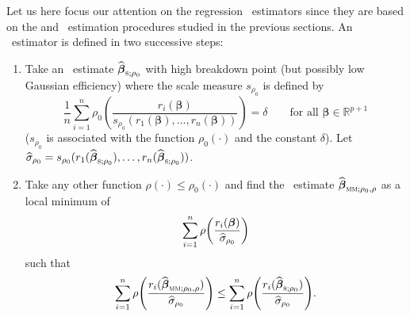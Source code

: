 Let us here focus our attention on the regression ~estimators since
they are based on the  and ~estimation procedures studied in
the previous sections. An ~estimator is defined in two successive
steps:

\begin{enumerate}
    \item Take an ~estimate $\sthat{\boldsymbol\beta}_{\stsc{S};\rho_0}$
    with high breakdown point (but possibly low Gaussian efficiency) where the scale
    measure $s_{\rho_0}$ is defined by
    \[
        \frac{1}{n} \sum_{i=1}^{n}\rho_0\left(\frac{r_i(\boldsymbol\beta)}
            {s_{\rho_0}(r_1(\boldsymbol\beta), \dots, r_n(\boldsymbol\beta))}\right) 
            = \delta
        \qquad\text{for all $\boldsymbol\beta\in\mathbb{R}^{p+1}$}
    \]
    ($s_{\rho_0}$ is associated with the function $\rho_0(\cdot)$ and the
    constant $\delta$). Let $\sthat{\sigma}_{\rho_0} =
    s_{\rho_0}(r_1(\sthat{\boldsymbol\beta}_{\stsc{S};\rho_0}),\allowbreak
    \dots,\allowbreak r_n(\sthat{\boldsymbol\beta}_{\stsc{S};\rho_0}))$.

    \item Take any other function $\rho(\cdot) \leq \rho_0(\cdot)$ and find
    the ~estimate $\sthat{\boldsymbol\beta}_{\stsc{MM};\rho_0,\rho}$
    as a local minimum of
    \begin{equation}\label{eq:MM_min}
        \sum_{i=1}^{n} \rho\left(\frac{r_i(\boldsymbol\beta)}{\sthat{\sigma}_{\rho_0}}\right)
    \end{equation}
    such that
    \begin{equation}\label{eq:MM_inequality}
        \sum_{i=1}^{n} \rho\left(\frac{r_i(\sthat{\boldsymbol\beta}_{\stsc{MM};\rho_0,\rho})}
            {\sthat{\sigma}_{\rho_0}}\right)
     \leq \sum_{i=1}^{n}\rho\left(\frac{r_i(\sthat{\boldsymbol\beta}_{\stsc{S};\rho_0})}
         {\sthat{\sigma}_{\rho_0}}\right).
    \end{equation}
\end{enumerate}

